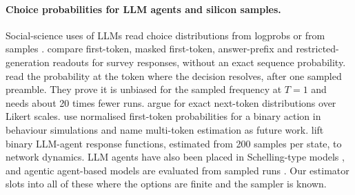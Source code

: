 \paragraph{Choice probabilities for LLM agents and silicon samples.}
Social-science uses of LLMs read choice distributions from logprobs or from samples \citep{argyle2023outofone,santurkar2023opinions,dominguezolmedo2024questioning,meister2025distributional}.
\citet{ahnert2026survey} compare first-token, masked first-token, answer-prefix and restricted-generation readouts for survey responses, without an exact sequence probability.
\citet{sun2025choice} read the probability at the token where the decision resolves, after one sampled preamble.
They prove it is unbiased for the sampled frequency at $T=1$ and needs about 20 times fewer runs.
\citet{wadi2026likert} argue for exact next-token distributions over Likert scales.
\citet{schwager2026confidence} use normalised first-token probabilities for a binary action in behaviour simulations and name multi-token estimation as future work.
\citet{baumann2026networks} lift binary LLM-agent response functions, estimated from 200 samples per state, to network dynamics.
LLM agents have also been placed in Schelling-type models \citep{cheng2024micromotives}, and agentic agent-based models are evaluated from sampled runs \citep{agenticabm2026}.
Our estimator slots into all of these where the options are finite and the sampler is known.
